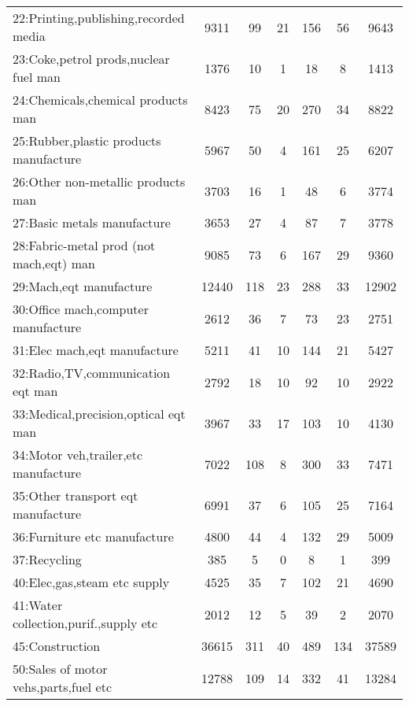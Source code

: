 {\begin{longtable}{l*{6}{c}}
22:Printing,publishing,recorded media&     9311&       99&       21&      156&       56&     9643\\
23:Coke,petrol prods,nuclear fuel man&     1376&       10&        1&       18&        8&     1413\\
24:Chemicals,chemical products man&     8423&       75&       20&      270&       34&     8822\\
25:Rubber,plastic products manufacture&     5967&       50&        4&      161&       25&     6207\\
26:Other non-metallic products man&     3703&       16&        1&       48&        6&     3774\\
27:Basic metals manufacture&     3653&       27&        4&       87&        7&     3778\\
28:Fabric-metal prod (not mach,eqt) man&     9085&       73&        6&      167&       29&     9360\\
29:Mach,eqt manufacture&    12440&      118&       23&      288&       33&    12902\\
30:Office mach,computer manufacture&     2612&       36&        7&       73&       23&     2751\\
31:Elec mach,eqt manufacture&     5211&       41&       10&      144&       21&     5427\\
32:Radio,TV,communication eqt man&     2792&       18&       10&       92&       10&     2922\\
33:Medical,precision,optical eqt man&     3967&       33&       17&      103&       10&     4130\\
34:Motor veh,trailer,etc manufacture&     7022&      108&        8&      300&       33&     7471\\
35:Other transport eqt manufacture&     6991&       37&        6&      105&       25&     7164\\
36:Furniture etc manufacture&     4800&       44&        4&      132&       29&     5009\\
37:Recycling&      385&        5&        0&        8&        1&      399\\
40:Elec,gas,steam etc supply&     4525&       35&        7&      102&       21&     4690\\
41:Water collection,purif.,supply etc&     2012&       12&        5&       39&        2&     2070\\
45:Construction&    36615&      311&       40&      489&      134&    37589\\
50:Sales of motor vehs,parts,fuel etc&    12788&      109&       14&      332&       41&    13284\\

\end{longtable}}
